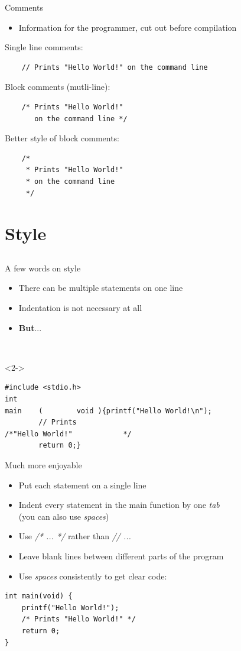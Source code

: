 \begin{frame}[fragile]{Comments}
	\begin{itemize}
		\item Information for the programmer, cut out before compilation
	\end{itemize}
	Single line comments:
	\begin{lstlisting}
	// Prints "Hello World!" on the command line
\end{lstlisting}
	Block comments (mutli-line):
	\begin{lstlisting}
	/* Prints "Hello World!"
	   on the command line */
\end{lstlisting}
	Better style of block comments:
	\begin{lstlisting}
	/*
	 * Prints "Hello World!"
	 * on the command line
	 */
\end{lstlisting}
\end{frame}
\section{Style}
\subsection{}
\begin{frame}[fragile]{A few words on style}
	\begin{itemize}
		\item There can be multiple statements on one line
		\item Indentation is not necessary at all
		\item<2-> \textbf{But}...
	\end{itemize}
	\ \\
	\begin{uncoverenv}<2->
	\begin{lstlisting}[numbers=none]
#include <stdio.h>
int
main	(        void ){printf("Hello World!\n");
		// Prints
/*"Hello World!"			*/
		return 0;}
\end{lstlisting}
	\end{uncoverenv}
\end{frame}
\begin{frame}[fragile]{Much more enjoyable}
	\begin{itemize}
		\item Put each statement on a single line
		\item Indent every statement in the main function by one \textit{tab}\\
		 (you can also use \textit{spaces})
		\item Use \textit{/* ... */} rather than \textit{// ...}
		\item Leave blank lines between different parts of the program
		\item Use \textit{spaces} consistently to get clear code:
	\end{itemize}
	\begin{lstlisting}[numbers=none,showspaces=true,showtabs=true]
int main(void) {
	printf("Hello World!");
	/* Prints "Hello World!" */
	return 0;
}
\end{lstlisting}
\end{frame}



